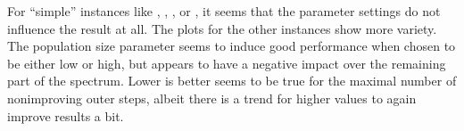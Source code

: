 \documentclass[thesis.tex]{subfiles}
\begin{document}
For \enquote{simple} instances like , , , or , it seems that the parameter settings do not influence the result at all. The plots for the other instances show more variety. The population size parameter seems to induce good performance when chosen to be either low or high, but appears to have a negative impact over the remaining part of the spectrum. Lower is better seems to be true for the maximal number of nonimproving outer steps, albeit there is a trend for higher values to again improve results a bit.

\end{document}
